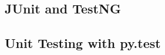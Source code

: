 \subsection{JUnit and TestNG}
\label{sec:unit-junit-testng}
\subsection{Unit Testing with py.test}
\label{sec:unit-pytest}
